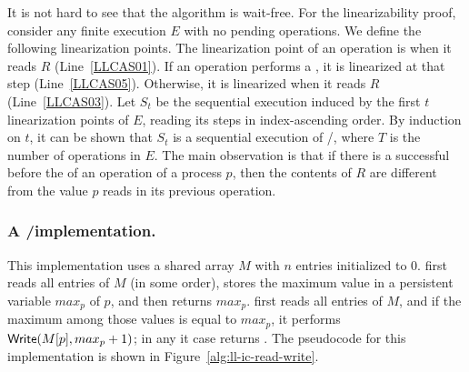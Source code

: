 \begin{proofT}
  It is not hard to see that the algorithm is wait-free. For the linearizability proof, consider any finite execution $E$ with no pending operations. We define the following linearization points. The linearization point of an \LL operation is when it reads $R$ (Line~\ref{LLCAS01}). If an \IC operation performs a \CAS, it is linearized at that step (Line~\ref{LLCAS05}). Otherwise, it is linearized when it reads $R$ (Line~\ref{LLCAS03}). Let $S_t$ be the sequential execution induced by the first $t$ linearization points of $E$, reading its steps in index-ascending order. By induction on $t$, it can be shown that $S_t$ is a sequential execution of \LL/\IC, where $T$ is the number of operations in $E$. The main observation is that if there is a successful \CAS before the \CAS of an \IC operation of a process $p$, then the contents of $R$ are different from the value $p$ reads in its previous \LL operation.
\end{proofT}

\subsubsection{A \R/\W implementation.}
This implementation uses a shared array $M$ with $n$ entries initialized to 0.  \LL first reads all entries of $M$ (in some order), stores the maximum value in a persistent variable $max_p$ of $p$, and then returns $max_p$.  \IC first reads all entries of $M$, and if the maximum among those values is equal to $max_p$, it performs ${\sf Write}(M[p], max_p + 1)$; in any it case returns \ok.  The pseudocode for this implementation is shown in Figure~\ref{alg:ll-ic-read-write}.

